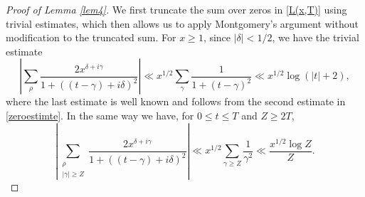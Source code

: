 \documentclass{amsart}
\newcommand{\1}{\mathbbm{1}}
\theoremstyle{remark}
\numberwithin{equation}{section}
\begin{document}
\begin{proof}[Proof of Lemma \ref{lem4}] We first truncate the sum over zeros in \eqref{L(x,T)} using trivial estimates, which then allows us to apply Montgomery's argument without modification to the truncated sum. For $x\ge 1$, since $|\delta|< 1/2$, we have the trivial estimate
\begin{equation}\label{trivialestimate} \left|\sum_\rho \frac{2x^{\delta+i\gamma}}{1+ \left((t-\gamma)+i\delta\right)^2 }\right|\ll x^{1/2}\sum_\gamma \frac1{1+(t-\gamma)^2} \ll x^{1/2}\log(|t|+2),\end{equation}
where the last estimate is well known and follows from the second estimate in \eqref{zeroestimte}.
In the same way we have, for $0\le t \le T$ and $Z\ge 2T$,
\begin{equation}\label{trivialestimate2} \left|\sum_{\substack{ \rho \\ |\gamma| \ge Z}}\frac{2x^{\delta+i\gamma}}{1+ \left((t-\gamma)+i\delta\right)^2 }\right|\ll x^{1/2}\sum_{\gamma\ge Z} \frac1{\gamma^2} \ll \frac{x^{1/2}\log Z}{Z}.\end{equation}


\end{proof}
\end{document}
